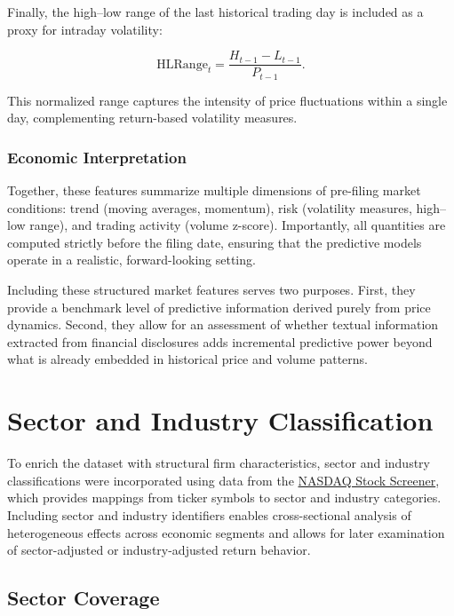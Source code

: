 Finally, the high–low range of the last historical trading day is included as a proxy for intraday volatility:

\begin{equation}
\text{HLRange}_t =
\frac{H_{t-1} - L_{t-1}}{P_{t-1}}.
\end{equation}

This normalized range captures the intensity of price fluctuations within a single day, complementing return-based volatility measures.

\subsubsection*{Economic Interpretation}

Together, these features summarize multiple dimensions of pre-filing market conditions: trend (moving averages, momentum), risk (volatility measures, high–low range), and trading activity (volume z-score). Importantly, all quantities are computed strictly before the filing date, ensuring that the predictive models operate in a realistic, forward-looking setting.

Including these structured market features serves two purposes. First, they provide a benchmark level of predictive information derived purely from price dynamics. Second, they allow for an assessment of whether textual information extracted from financial disclosures adds incremental predictive power beyond what is already embedded in historical price and volume patterns.

\section{Sector and Industry Classification}

To enrich the dataset with structural firm characteristics, sector and industry classifications were incorporated using data from the \href{https://www.nasdaq.com/market-activity/stocks/screener}{NASDAQ Stock Screener}, which provides mappings from ticker symbols to sector and industry categories. 
Including sector and industry identifiers enables cross-sectional analysis of heterogeneous effects across economic segments and allows for later examination of sector-adjusted or industry-adjusted return behavior.

\subsection*{Sector Coverage}

